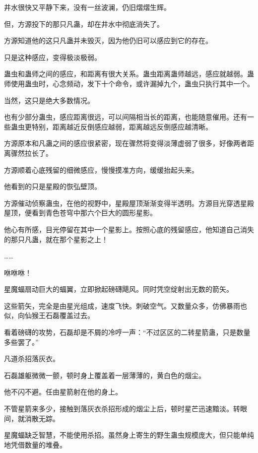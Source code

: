 
\begin{this_body}

井水很快又平静下来，没有一丝波澜，仍旧熠熠生辉。

但，方源投下的那只凡蛊，却在井水中彻底消失了。

方源知道他的这只凡蛊并未毁灭，因为他仍旧可以感应到它的存在。

只是这种感应，变得极淡极弱。

蛊虫和蛊师之间的感应，和距离有很大关系。蛊虫距离蛊师越远，感应就越弱。蛊师使用蛊虫时，心念频动，发下十个命令，或许漏掉九个，蛊虫只执行其中一个。

当然，这只是绝大多数情况。

也有少部分蛊虫，感应距离很远，可以间隔相当长的距离，也能随意催用。还有一些蛊虫更特别，距离越近反倒感应越弱，距离越远反倒感应越清晰。

方源原本和凡蛊之间的感应很紧密，现在骤然将变得淡薄虚弱了很多，好像两者距离骤然拉长了。

方源顺着心底残留的细微感应，慢慢摸准方向，缓缓抬起头来。

他看到的只是星殿的恢弘壁顶。

方源催动侦察蛊虫，在他的视野中，星殿屋顶渐渐变得半透明。方源目光穿透星殿屋顶，便看到青色苍穹中那六个巨大的圆形星影。

他心有所感，目光停留在其中一个星影上。按照心底的残留感应，他知道自己消失的那只凡蛊，就在那个星影之上！

……

咻咻咻！

星魔蝠扇动巨大的蝠翼，立即掀起磅礴飓风。同时凭空绽射出无数的箭矢。

这些箭矢，完全是由星光组成，速度飞快。刺破空气。又数量众多，仿佛暴雨也似，向仙猴王石磊覆盖过去。

看着磅礴的攻势，石磊却是不屑的冷哼一声：“不过区区的二转星箭蛊，只是数量多些罢了。”

凡道杀招落灰衣。

石磊雄躯微微一颤，顿时身上覆盖着一层薄薄的，黄白色的烟尘。

他不闪不避。任由星箭射在他的身上。

不管星箭来多少，接触到落灰衣杀招形成的烟尘上后，顿时星芒迅速黯淡。转眼间，就消散无踪。

星魔蝠缺乏智慧，不能使用杀招。虽然身上寄生的野生蛊虫规模庞大，但只能单纯地凭借数量的堆叠。


\end{this_body}
